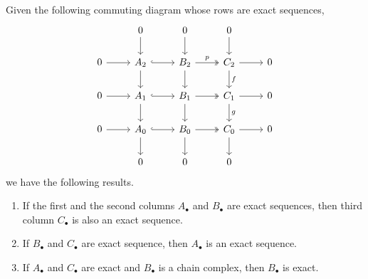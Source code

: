 \documentclass[main.tex]{subfiles}
\begin{document}
\begin{theorem}
  \label{thm:nine_lemma}
  Given the following commuting diagram whose rows are exact sequences,
  \begin{equation*}
    \begin{tikzcd}
      & 0
      \arrow[d]
      & 0
      \arrow[d]
      & 0
      \arrow[d]
      \\
      0
      \arrow[r]
      & A_{2}
      \arrow[r, hook]
      \arrow[d]
      & B_{2}
      \arrow[r, two heads, "p"]
      \arrow[d]
      & C_{2}
      \arrow[r]
      \arrow[d, "f"]
      & 0
      \\
      0
      \arrow[r]
      & A_{1}
      \arrow[r, hook]
      \arrow[d]
      & B_{1}
      \arrow[r, two heads]
      \arrow[d]
      & C_{1}
      \arrow[r]
      \arrow[d, "g"]
      & 0
      \\
      0
      \arrow[r]
      & A_{0}
      \arrow[r, hook]
      \arrow[d]
      & B_{0}
      \arrow[r, two heads]
      \arrow[d]
      & C_{0}
      \arrow[r]
      \arrow[d]
      & 0
      \\
      & 0
      & 0
      & 0
    \end{tikzcd}
  \end{equation*}
  we have the following results.
  \begin{enumerate}
    \item If the first and the second columns $A_{\bullet}$ and $B_{\bullet}$ are exact sequences, then third column $C_{\bullet}$ is also an exact sequence.

    \item If $B_{\bullet}$ and $C_{\bullet}$ are exact sequence, then $A_{\bullet}$ is an exact sequence.

    \item If $A_{\bullet}$ and $C_{\bullet}$ are exact and $B_{\bullet}$ is a chain complex, then $B_{\bullet}$ is exact.
  \end{enumerate}
\end{theorem}
\end{document}
